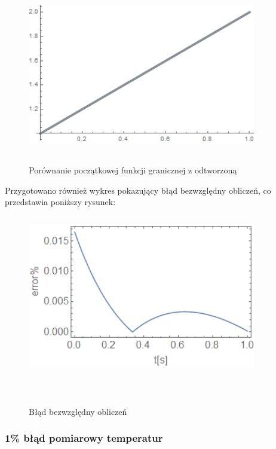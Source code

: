 \documentclass[twoside]{projektInzynierskiMS1}
\begin{document}
\begin{figure}[H]
\begin{center}
		\includegraphics[height=7cm, width=10cm]{pics/0reconstruction.png}\\
	\caption{Porównanie początkowej funkcji granicznej z odtworzoną}
\end{center}
\end{figure}

Przygotowano również wykres pokazujący błąd bezwzględny obliczeń, co przedstawia poniższy rysunek: \\

\begin{figure}[H]
\begin{center}
		\includegraphics[height=7cm, width=10cm]{pics/0abs.png}\\
	\caption{Błąd bezwzględny obliczeń}\
\end{center}
\end{figure}

\subsubsection{1\% błąd pomiarowy temperatur}
\end{document}
